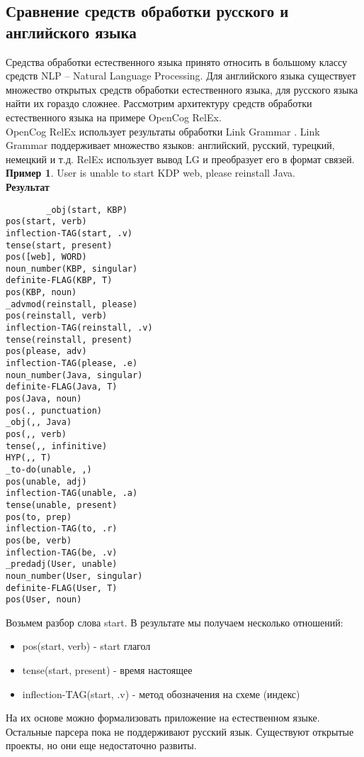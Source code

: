 \clearpage
\subsection{Сравнение средств обработки русского и английского языка} \label{sect2_3}
Средства обработки естественного языка принято относить в большому классу средств NLP – Natural Language Processing. Для английского языка существует множество открытых средств обработки естественного языка, для русского языка найти их гораздо сложнее. Рассмотрим архитектуру средств обработки естественного языка на примере OpenCog RelEx. \\
OpenCog RelEx использует результаты обработки Link Grammar \cite{linkgrammar}. Link Grammar поддерживает множество языков: английский, русский, турецкий, немецкий и т.д.  RelEx использует вывод LG и преобразует его в формат связей.
\textbf{Пример 1}. User is unable to start KDP web, please reinstall Java.\\
\textbf{Результат} 
\begin{verbatim}
		_obj(start, KBP)
pos(start, verb)
inflection-TAG(start, .v)
tense(start, present)
pos([web], WORD)
noun_number(KBP, singular)
definite-FLAG(KBP, T)
pos(KBP, noun)
_advmod(reinstall, please)
pos(reinstall, verb)
inflection-TAG(reinstall, .v)
tense(reinstall, present)
pos(please, adv)
inflection-TAG(please, .e)
noun_number(Java, singular)
definite-FLAG(Java, T)
pos(Java, noun)
pos(., punctuation)
_obj(,, Java)
pos(,, verb)
tense(,, infinitive)
HYP(,, T)
_to-do(unable, ,)
pos(unable, adj)
inflection-TAG(unable, .a)
tense(unable, present)
pos(to, prep)
inflection-TAG(to, .r)
pos(be, verb)
inflection-TAG(be, .v)
_predadj(User, unable)
noun_number(User, singular)
definite-FLAG(User, T)
pos(User, noun)

\end{verbatim}



Возьмем разбор слова start. В результате мы получаем несколько отношений:
\begin{itemize}
	\item pos(start, verb) - start глагол
	\item tense(start, present) - время настоящее
	\item inflection-TAG(start, .v) -  метод обозначения на схеме (индекс)
\end{itemize}

На их основе можно формализовать приложение на естественном языке. Остальные парсера пока не поддерживают русский язык. Существуют открытые проекты, но они еще недостаточно развиты.
